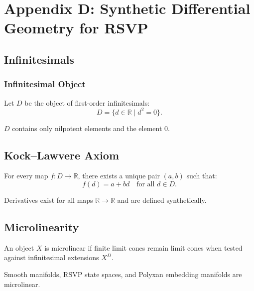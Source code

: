 \chapter*{Appendix D: Synthetic Differential Geometry for RSVP}

\section{Infinitesimals}

\subsection{Infinitesimal Object}

\begin{definition}[Infinitesimal]
Let $D$ be the object of first-order infinitesimals:
\[
D = \{ d \in \mathbb{R} \mid d^2 = 0 \}.
\]
\end{definition}

\begin{proposition}
$D$ contains only nilpotent elements and the element $0$.
\end{proposition}

\section{Kock--Lawvere Axiom}

\begin{axiom}
For every map $f : D \to \mathbb{R}$, there exists a unique pair $(a,b)$ such that:
\[
f(d) = a + b d \quad \text{for all } d\in D.
\]
\end{axiom}

\begin{corollary}
Derivatives exist for all maps $\mathbb{R}\to\mathbb{R}$ and are defined synthetically.
\end{corollary}

\section{Microlinearity}

\begin{definition}
An object $X$ is microlinear if finite limit cones remain limit cones when tested against infinitesimal extensions $X^D$.
\end{definition}

\begin{proposition}
Smooth manifolds, RSVP state spaces, and Polyxan embedding manifolds are microlinear.
\end{proposition}

